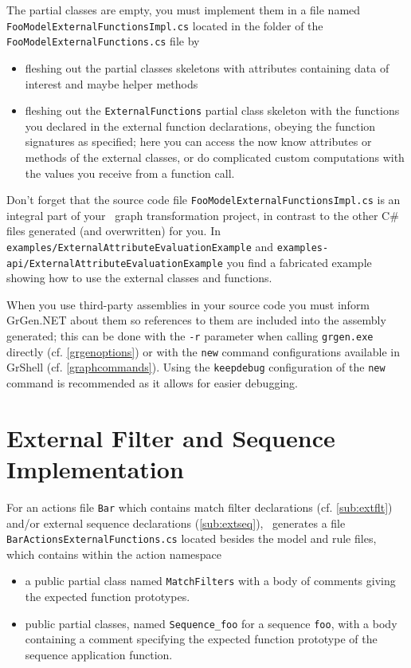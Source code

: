 \noindent The partial classes are empty, you must implement them in a file named \texttt{FooModelExternal\-FunctionsImpl.cs} located in the folder of the \texttt{FooModelExternalFunctions.cs} file by
\begin{itemize}
	\item fleshing out the partial classes skeletons with attributes containing data of interest and maybe helper methods
	\item fleshing out the \texttt{ExternalFunctions} partial class skeleton with the functions you declared in the external function declarations, obeying the function signatures as specified; here you can access the now know attributes or methods of the external classes, or do complicated custom computations with the values you receive from a function call.
\end{itemize}

\noindent Don't forget that the source code file \texttt{FooModelExternalFunctionsImpl.cs} is an integral part of your \GrG~graph transformation project, in contrast to the other C\# files generated (and overwritten) for you.
In \texttt{examples/ExternalAttributeEvaluationExample} and \texttt{examples-api/ExternalAttributeEvaluationExample}
you find a fabricated example showing how to use the external classes and functions.

When you use third-party assemblies in your source code you must inform GrGen.NET about them so references to them are included into the assembly generated; this can be done with the \texttt{-r} parameter when calling \texttt{grgen.exe} directly (cf. \ref{grgenoptions}) or with the \texttt{new} command configurations available in GrShell (cf. \ref{graphcommands}). Using the \texttt{keepdebug} configuration of the \texttt{new} command is recommended as it allows for easier debugging.


\section{External Filter and Sequence Implementation}\label{sub:extfltseqimpl}

For an actions file \texttt{Bar} which contains match filter declarations (cf. \ref{sub:extflt}) and/or external sequence declarations (\ref{sub:extseq}), \GrG~generates a file \texttt{BarActionsExternalFunctions.cs} located besides the model and rule files, which contains within the action namespace 
\begin{itemize}
	\item a public partial class named \texttt{MatchFilters} with a body of comments giving the expected function prototypes.
	\item public partial classes, named \texttt{Sequence\_foo} for a sequence \texttt{foo}, with a body containing a comment specifying the expected function prototype of the sequence application function.
\end{itemize}

